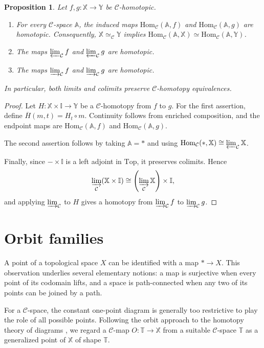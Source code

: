 \documentclass[12pt]{amsart}
\newtheorem{prop}[teo]{Proposition}
\theoremstyle{definition}
\theoremstyle{remark}
\numberwithin{figure}{section}%
\newcommand{\CC}{\mathcal{C}}
\newcommand{\Top}{\mathrm{Top}}
\newcommand{\X}{\mathbb{X}}
\newcommand{\Y}{\mathbb{Y}}
\newcommand{\T}{\mathbb{T}}
\newcommand{\Hom}{\mathrm{Hom}}
\newcommand{\Aa}{\mathbb{A}}
\begin{document}
\begin{prop}
\label{prop:Hom_preserves_homotopies}
\label{cor:limit-preserves-homotopies}
\label{pro:colimit_preserves_homotopies}
Let $f,g\colon\X\to\Y$ be $\CC$-homotopic.
\begin{enumerate}
    \item For every $\CC$-space $\Aa$, the induced maps
    $\Hom_{\CC}(\Aa,f)$ and $\Hom_{\CC}(\Aa,g)$ are homotopic.
    Consequently, $\X\simeq_{\CC}\Y$ implies
    $\Hom_{\CC}(\Aa,\X)\simeq\Hom_{\CC}(\Aa,\Y)$.

    \item The maps $\varprojlim_{\CC}f$ and
    $\varprojlim_{\CC}g$ are homotopic.

    \item The maps $\varinjlim_{\CC}f$ and
    $\varinjlim_{\CC}g$ are homotopic.
\end{enumerate}
In particular, both limits and colimits preserve
$\CC$-homotopy equivalences.
\end{prop}

\begin{proof}
Let $H\colon\X\times\mathbb I\to\Y$ be a $\CC$-homotopy from $f$ to
$g$. For the first assertion, define
$\overline H(m,t)=H_t\circ m$. Continuity follows from enriched
composition, and the endpoint maps are
$\Hom_{\CC}(\Aa,f)$ and $\Hom_{\CC}(\Aa,g)$.

The second assertion follows by taking $\Aa=*$ and using
$\Hom_{\CC}(*,\X)\cong\varprojlim_{\CC}\X$.

Finally, since $-\times\mathbb I$ is a left adjoint in $\Top$, it
preserves colimits. Hence
\[
\varinjlim_{\CC}(\X\times\mathbb I)
\cong
\left(\varinjlim_{\CC}\X\right)\times\mathbb I,
\]
and applying $\varinjlim_{\CC}$ to $H$ gives a homotopy from
$\varinjlim_{\CC}f$ to $\varinjlim_{\CC}g$.
\end{proof}
\section{Orbit families}
\label{sec:orbits}

A point of a topological space $X$ can be identified with a map
$*\to X$. This observation underlies several elementary notions: a map is
surjective when every point of its codomain lifts, and a space is
path-connected when any two of its points can be joined by a path.

For a $\CC$-space, the constant one-point diagram is generally too
restrictive to play the role of all possible points. Following the orbit
approach to the homotopy theory of diagrams
\cite{FarjounBig,Farjoun_Hom,Farjou_Zabrodsky,Housden}, we regard a
$\CC$-map $O\colon\T\to\X$ from a suitable $\CC$-space $\T$ as a
generalized point of $\X$ of shape $\T$.
\end{document}
